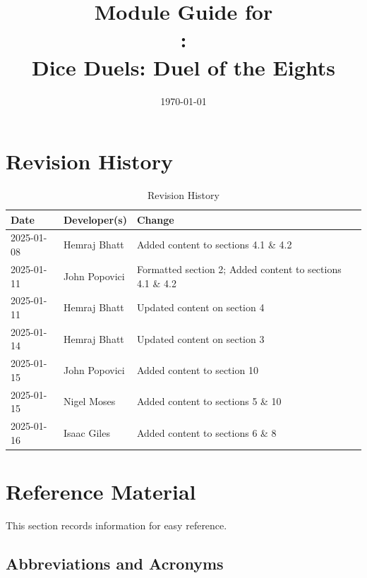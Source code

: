 \documentclass[12pt, titlepage]{article}
\begin{document}
\title{Module Guide for \\\progname: \\Dice Duels: Duel of the Eights} 
\author{\authname}
\date{\today}

\maketitle


\section{Revision History}

\begin{table}[hp]
\caption{Revision History} \label{TblRevisionHistory}
\begin{tabularx}{\textwidth}{llX}
\toprule
\textbf{Date} & \textbf{Developer(s)} & \textbf{Change}\\
\midrule
2025-01-08 & Hemraj Bhatt & Added content to sections 4.1 \& 4.2\\
2025-01-11 & John Popovici & Formatted section 2; Added content to sections 4.1 \& 4.2\\
2025-01-11 & Hemraj Bhatt & Updated content on section 4\\
2025-01-14 & Hemraj Bhatt & Updated content on section 3\\
2025-01-15 & John Popovici & Added content to section 10\\
2025-01-15 & Nigel Moses & Added content to sections 5 \& 10\\
2025-01-16 & Isaac Giles & Added content to sections 6 \& 8\\
\bottomrule
\end{tabularx}
\end{table}

\newpage

\section{Reference Material}

This section records information for easy reference.

\subsection{Abbreviations and Acronyms}
\end{document}

